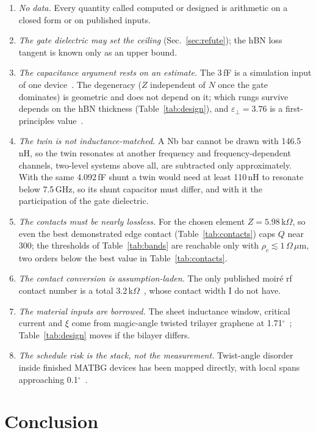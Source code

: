 \documentclass[aps,prb,reprint,superscriptaddress,longbibliography]{revtex4-2}
\begin{document}
\begin{enumerate}
\item \emph{No data.} Every quantity called computed or designed is
arithmetic on a closed form or on published inputs.
\item \emph{The gate dielectric may set the ceiling}
(Sec.~\ref{sec:refute}); the hBN loss tangent is known only as an upper
bound.
\item \emph{The capacitance argument rests on an estimate.} The 3\,fF is
a simulation input of one device~\cite{Tanaka2025}. The degeneracy
($Z$ independent of $N$ once the gate dominates) is geometric and does
not depend on it; which rungs survive depends on the hBN thickness
(Table~\ref{tab:design}), and $\varepsilon_\perp = 3.76$ is a
first-principles value~\cite{Laturia2018}.
\item \emph{The twin is not inductance-matched.} A Nb bar cannot be
drawn with 146.5\,nH, so the twin resonates at another frequency and
frequency-dependent channels, two-level systems above all, are
subtracted only approximately. With the same 4.092\,fF shunt a twin
would need at least 110\,nH to resonate below 7.5\,GHz, so its shunt
capacitor must differ, and with it the participation of the gate
dielectric.
\item \emph{The contacts must be nearly lossless.} For the chosen
element $Z = 5.98$\,k$\Omega$, so even the best demonstrated edge
contact (Table~\ref{tab:contacts}) caps $Q$ near 300; the thresholds of
Table~\ref{tab:bands} are reachable only with $\rho_c \lesssim
1\,\Omega\,\mu$m, two orders below the best value in
Table~\ref{tab:contacts}.
\item \emph{The contact conversion is assumption-laden.} The only
published moir\'e rf contact number is a total
3.2\,k$\Omega$~\cite{Banerjee2025}, whose contact width I do not have.
\item \emph{The material inputs are borrowed.} The sheet inductance
window, critical current and $\xi$ come from magic-angle twisted
trilayer graphene at 1.71$^\circ$~\cite{Jha2025}; Table~\ref{tab:design}
moves if the bilayer differs.
\item \emph{The schedule risk is the stack, not the measurement.}
Twist-angle disorder inside finished MATBG devices has been mapped
directly, with local spans approaching 0.1$^\circ$~\cite{Uri2020}.
\end{enumerate}

\section{Conclusion}
\end{document}
